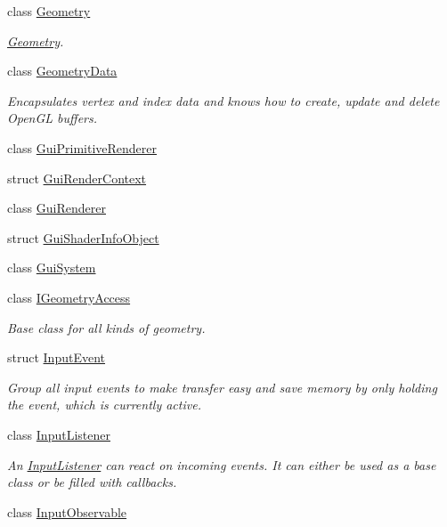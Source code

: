 \begin{DoxyCompactItemize}
class \mbox{\hyperlink{classec_1_1_geometry}{Geometry}}
\begin{DoxyCompactList}\small\item\em \mbox{\hyperlink{classec_1_1_geometry}{Geometry}}. \end{DoxyCompactList}\item 
class \mbox{\hyperlink{classec_1_1_geometry_data}{Geometry\+Data}}
\begin{DoxyCompactList}\small\item\em Encapsulates vertex and index data and knows how to create, update and delete Open\+GL buffers. \end{DoxyCompactList}\item 
class \mbox{\hyperlink{classec_1_1_gui_primitive_renderer}{Gui\+Primitive\+Renderer}}
\item 
struct \mbox{\hyperlink{structec_1_1_gui_render_context}{Gui\+Render\+Context}}
\item 
class \mbox{\hyperlink{classec_1_1_gui_renderer}{Gui\+Renderer}}
\item 
struct \mbox{\hyperlink{structec_1_1_gui_shader_info_object}{Gui\+Shader\+Info\+Object}}
\item 
class \mbox{\hyperlink{classec_1_1_gui_system}{Gui\+System}}
\item 
class \mbox{\hyperlink{classec_1_1_i_geometry_access}{I\+Geometry\+Access}}
\begin{DoxyCompactList}\small\item\em Base class for all kinds of geometry. \end{DoxyCompactList}\item 
struct \mbox{\hyperlink{structec_1_1_input_event}{Input\+Event}}
\begin{DoxyCompactList}\small\item\em Group all input events to make transfer easy and save memory by only holding the event, which is currently active. \end{DoxyCompactList}\item 
class \mbox{\hyperlink{classec_1_1_input_listener}{Input\+Listener}}
\begin{DoxyCompactList}\small\item\em An \mbox{\hyperlink{classec_1_1_input_listener}{Input\+Listener}} can react on incoming events. It can either be used as a base class or be filled with callbacks. \end{DoxyCompactList}\item 
class \mbox{\hyperlink{classec_1_1_input_observable}{Input\+Observable}}

\end{DoxyCompactItemize}
